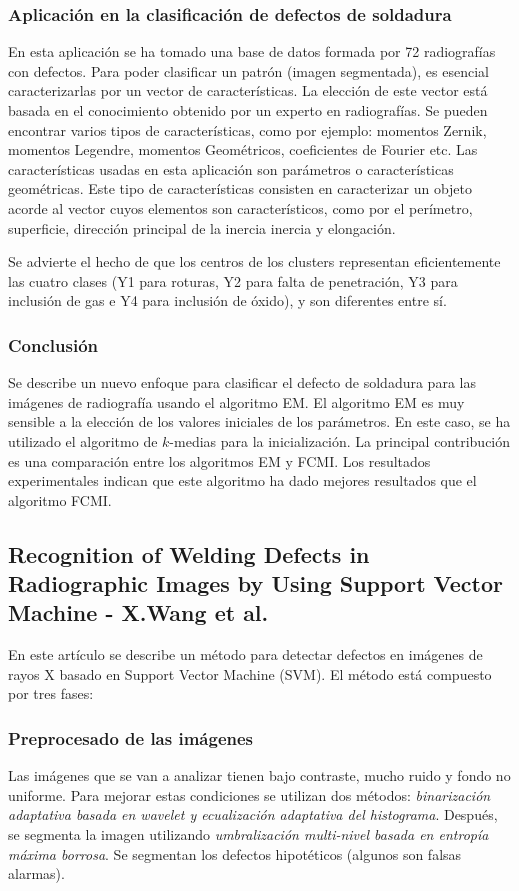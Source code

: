 \subsubsection{Aplicación en la clasificación de defectos de soldadura}
En esta aplicación se ha tomado una base de datos formada por 72 radiografías con defectos.
Para poder clasificar un patrón (imagen segmentada), es esencial caracterizarlas por un vector de características. La elección de este vector está basada en el conocimiento obtenido por un experto en radiografías. Se pueden encontrar varios tipos de características, como por ejemplo: momentos Zernik, momentos Legendre, momentos Geométricos, coeficientes de Fourier etc.
Las características usadas en esta aplicación son parámetros o características geométricas. Este tipo de características consisten en caracterizar un objeto acorde al vector cuyos elementos son característicos, como por el perímetro, superficie, dirección principal de la inercia inercia y elongación.

Se advierte el hecho de que los centros de los clusters representan eficientemente las cuatro clases (Y1 para roturas, Y2 para falta de penetración, Y3 para inclusión de gas e Y4 para inclusión de óxido), y son diferentes entre sí. 


\subsubsection{Conclusión}
Se describe un nuevo enfoque para clasificar el defecto de soldadura para las imágenes de radiografía usando el algoritmo EM. El algoritmo EM es muy sensible a la elección de los valores iniciales de los parámetros. En este caso, se ha utilizado el algoritmo de $k$-medias para la inicialización. La principal contribución es una comparación entre los algoritmos EM y FCMI. Los resultados experimentales indican que este algoritmo ha dado mejores resultados que el algoritmo FCMI.



\subsection{Recognition of Welding Defects in Radiographic Images by Using Support Vector Machine - X.Wang et al.}
En este artículo \cite{wang2010recognition} se describe un método para detectar defectos en imágenes de rayos X basado en Support Vector Machine (SVM).
El método está compuesto por tres fases:


\subsubsection{Preprocesado de las imágenes}
 Las imágenes que se van a analizar tienen bajo contraste, mucho ruido y fondo no uniforme. Para mejorar estas condiciones se utilizan dos métodos: \textit{binarización adaptativa basada en wavelet y ecualización adaptativa del histograma}. 
Después, se segmenta la imagen utilizando \textit{umbralización multi-nivel basada en entropía máxima borrosa}.
Se segmentan los defectos hipotéticos (algunos son falsas alarmas).


